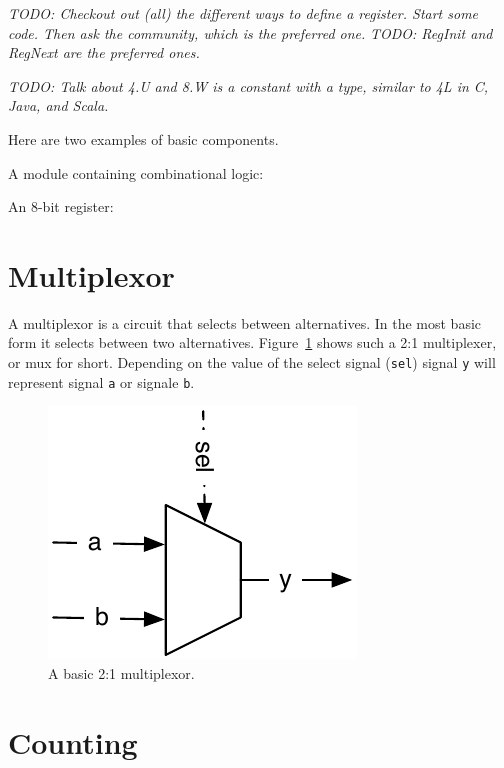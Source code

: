 \documentclass[%
    11pt, %
    headinclude, footexclude,
    openright, %
    notitlepage,
    cleardoubleempty,
    headsepline,
    pointlessnumbers,
    bibtotoc, idxtotoc,
    ]{scrbook}
\newcommand{\code}[1]{{\small{\texttt{#1}}}}
\newcommand{\todo}[1]{{\emph{TODO: #1}}}
\begin{document}
\todo{Checkout out (all) the different ways to define a register.
Start some code.
Then ask the community, which is the preferred one.}
\todo{RegInit and RegNext are the preferred ones.}



\todo{Talk about 4.U and 8.W is a constant with a type, similar to 4L in C, Java, and Scala.}

Here are two examples of basic components.

A module containing combinational logic:



An 8-bit register:



\section{Multiplexor}

A multiplexor is a circuit that selects between alternatives. In the most
basic form it selects between two alternatives. Figure~\ref{fig:mux} shows
such a 2:1 multiplexer, or mux for short. Depending on the value of the
select signal (\code{sel}) signal \code{y} will represent signal \code{a} or
signale \code{b}.

\begin{figure}
  \centering
  \includegraphics{figures/mux}

  \caption{A basic 2:1 multiplexor.}
  \label{fig:mux}
\end{figure}


\section{Counting}
\end{document}
